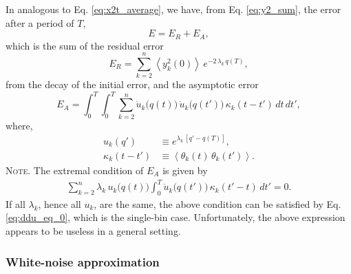 \documentclass[reprint, floatfix]{revtex4-1}
\newcommand{\note}[1]{{\color{DarkGreen}\footnotesize \textsc{Note.} #1}}
\newcommand{\Err}{E}
\begin{document}
In analogous to Eq. \eqref{eq:x2t_average},
we have, from Eq. \eqref{eq:y2_sum},
the error after a period of $T$,
%
\begin{equation}
  \Err
  =
  \Err_R + \Err_A,
  \label{eq:error_split}
\end{equation}
%
which is the sum of the residual error
%
\begin{equation}
  \Err_R
  =
  \sum_{k = 2}^n
    \left\langle y_k^2(0) \right\rangle \,
    e^{ - 2 \, \lambda_k  \, q(T) },
  \label{eq:error_res}
\end{equation}
%
from the decay of the initial error,
and the asymptotic error
\begin{equation}
  \Err_A
  =
  \int_0^T \int_0^T
  \sum_{k = 2}^n
    \dot u_k\bigl( q(t) \bigr) \,
    \dot u_k\bigl( q(t') \bigr) \,
    \kappa_k(t - t') \, dt \, dt',
  \label{eq:error_asym}
\end{equation}
%
where,
\begin{align*}
  u_k(q')
  &\equiv
  e^{\lambda_k \, [q' - q(T)]},
  \\
  \kappa_k(t - t')
  &\equiv
  \left\langle
    \theta_k(t) \, \theta_k(t')
  \right\rangle.
\end{align*}
%
\note{The extremal condition of $\Err_A$ is given by
%
\begin{align}
\sum_{k = 2}^n
\lambda_k \, u_k\bigl( q(t) \bigr)
\int_0^T
  \ddot u_k \bigl( q(t') \bigr) \,
  \kappa_k(t' - t) \, dt' = 0.
\label{eq:optimal_mbin}
\end{align}
%
If all $\lambda_k$, hence all $u_k$, are the same,
the above condition can be satisfied
by Eq. \eqref{eq:ddu_eq_0},
which is the single-bin case.
%
Unfortunately, the above expression
appears to be useless in a general setting.
}



\subsubsection{White-noise approximation}
\end{document}
